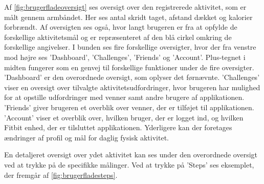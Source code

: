 \noindent
Af \autoref{fig:brugerfladeoversigt} ses oversigt over den registrerede aktivitet, som er målt gennem armbåndet. Her ses antal skridt taget, afstand dækket og kalorier forbrændt. Af oversigten ses også, hvor langt brugeren er fra at opfylde de forskellige aktivitetsmål og er repræsenteret af den blå cirkel omkring de forskellige angivelser. 
I bunden ses fire forskellige oversigter, hvor der fra venstre mod højre ses 'Dashboard', 'Challenges', 'Friends' og 'Account'. Plus-tegnet i midten fungerer som en genvej til forskellige funktioner under de fire oversigter. 
'Dashboard' er den overordnede oversigt, som oplyser det førnævnte.
'Challenges' viser en oversigt over tilvalgte aktivitetsudfordringer, hvor brugeren har mulighed for at opstille udfordringer med venner samt andre brugere af applikationen. 
'Friends' giver brugeren et overblik over venner, der er tilføjet til applikationen. 
'Account' viser et overblik over, hvilken bruger, der er logget ind, og hvilken Fitbit enhed, der er tilsluttet applikationen. Yderligere kan der foretages ændringer af profil og mål for daglig fysisk aktivitet. 

En detaljeret oversigt over ydet aktivitet kan ses under den overordnede oversigt ved at trykke på de specifikke målinger. Ved at trykke på 'Steps' ses eksemplet, der fremgår af \autoref{fig:brugerfladesteps}.  

